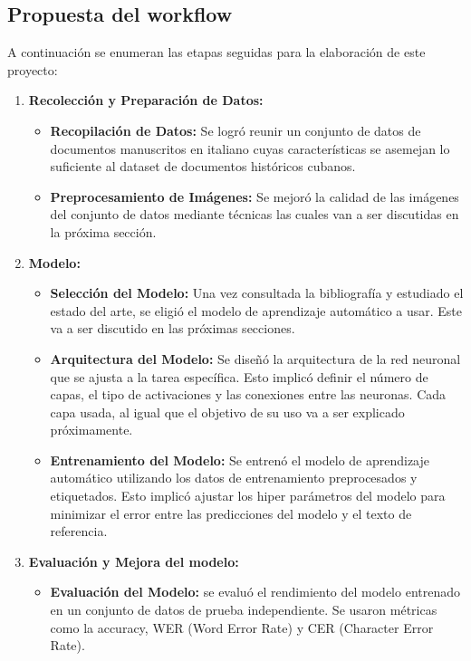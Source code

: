\documentclass{article}
\begin{document}
\subsection{Propuesta del workflow}
A continuación se enumeran las etapas seguidas para la elaboración de este proyecto:
\begin{enumerate}
    \item \textbf{Recolección y Preparación de Datos:} 
    \begin{itemize}
        \item \textbf{ Recopilación de Datos:} Se logró reunir un conjunto de datos de documentos manuscritos en italiano cuyas características se asemejan lo suficiente al dataset de documentos históricos cubanos. 
        \item \textbf{Preprocesamiento de Imágenes:}  Se mejoró la calidad de las imágenes del conjunto de datos mediante técnicas las cuales van a ser discutidas en la próxima sección.
    \end{itemize}

    \item \textbf{Modelo:}
    \begin{itemize}
        \item \textbf{Selección del Modelo:} Una vez consultada la bibliografía y estudiado el estado del arte, se eligió el modelo de aprendizaje automático a usar. Este va a ser discutido en las próximas secciones.
        \item \textbf{Arquitectura del Modelo: }Se diseñó la arquitectura de la red neuronal que se ajusta a la tarea específica. Esto implicó definir el número de capas, el tipo de activaciones y las conexiones entre las neuronas. Cada capa usada, al igual que el objetivo de su uso va a ser explicado próximamente.
        \item \textbf{Entrenamiento del Modelo:} Se entrenó el modelo de aprendizaje automático utilizando los datos de entrenamiento preprocesados y etiquetados. Esto implicó ajustar los hiper parámetros del modelo para minimizar el error entre las predicciones del modelo y el texto de referencia.
    \end{itemize}

    \item \textbf{Evaluación y Mejora del modelo:}
    \begin{itemize}
        \item \textbf{Evaluación del Modelo:} se evaluó el rendimiento del modelo entrenado en un conjunto de datos de prueba independiente. Se usaron métricas como la accuracy, WER (Word Error Rate) y CER (Character Error Rate).
    \end{itemize}
\end{enumerate}
\end{document}
